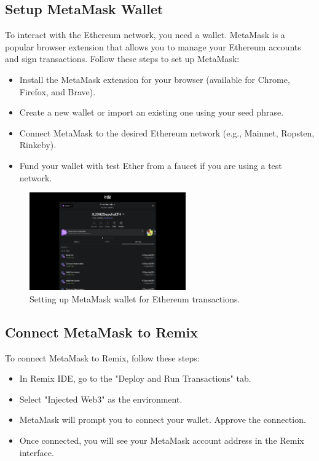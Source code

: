 \documentclass[12pt, a4paper]{article}
\begin{document}
\subsection{Setup MetaMask Wallet}
To interact with the Ethereum network, you need a wallet. MetaMask is a popular browser extension that allows you to manage your Ethereum accounts and sign transactions. Follow these steps to set up MetaMask:
\begin{itemize}
    \item Install the MetaMask extension for your browser (available for Chrome, Firefox, and Brave).
    \item Create a new wallet or import an existing one using your seed phrase.
    \item Connect MetaMask to the desired Ethereum network (e.g., Mainnet, Ropsten, Rinkeby).
    \item Fund your wallet with test Ether from a faucet if you are using a test network.
\end{itemize}
\begin{figure}[h]
    \centering
    \includegraphics[width=0.6\textwidth]{metamask_setup.png}
    \caption{Setting up MetaMask wallet for Ethereum transactions.}
    \label{fig:metamask_setup}
\end{figure}
\subsection{Connect MetaMask to Remix}
To connect MetaMask to Remix, follow these steps:
\begin{itemize}
    \item In Remix IDE, go to the "Deploy and Run Transactions" tab.
    \item Select "Injected Web3" as the environment.
    \item MetaMask will prompt you to connect your wallet. Approve the connection.
    \item Once connected, you will see your MetaMask account address in the Remix interface.
\end{itemize}
\end{document}
